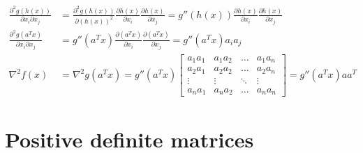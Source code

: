 \documentclass[11pt]{article}
\begin{document}
\begin{enumerate}
\begin{equation*}
	\begin{aligned}
\frac{\partial^2 g(h(x))}{\partial x_i \partial x_j} &= \frac{\partial^2 g(h(x))}{\partial (h(x))^2} \frac{\partial h(x)}{\partial x_i} \frac{\partial h(x)}{\partial x_j} = g''(h(x))\frac{\partial h(x)}{\partial x_i}\frac{\partial h(x)}{\partial x_j} \\
\frac{\partial^2 g(a^T x)}{\partial x_i \partial x_j} &= g''(a^T x)\frac{\partial (a^T x)}{\partial x_i}\frac{\partial (a^T x)}{\partial x_j} = g''(a^T x)a_i a_j \\
\nabla^2 f(x) &= \nabla^2 g(a^T x) = g''(a^T x) 
\begin{bmatrix}
a_1 a_1 & a_1 a_2 & \dots & a_1 a_n \\
a_2 a_1 & a_2 a_2 & \dots & a_2 a_n \\
\vdots & \vdots & \ddots & \vdots \\
a_n a_1 & a_n a_2 & \dots & a_n a_n
\end{bmatrix} = g''(a^T x)aa^T
	\end{aligned}
\end{equation*}
\color{black}

\end{enumerate}

\section{Positive definite matrices}
\end{document}
